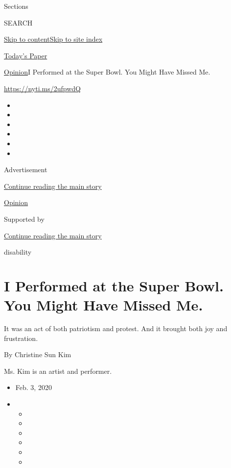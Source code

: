 Sections

SEARCH

\protect\hyperlink{site-content}{Skip to
content}\protect\hyperlink{site-index}{Skip to site index}

\href{https://myaccount.nytimes3xbfgragh.onion/auth/login?response_type=cookie\&client_id=vi}{}

\href{https://www.nytimes3xbfgragh.onion/section/todayspaper}{Today's
Paper}

\href{/section/opinion}{Opinion}\textbar{}I Performed at the Super Bowl.
You Might Have Missed Me.

\url{https://nyti.ms/2ufpwdQ}

\begin{itemize}
\item
\item
\item
\item
\item
\item
\end{itemize}

Advertisement

\protect\hyperlink{after-top}{Continue reading the main story}

\href{/section/opinion}{Opinion}

Supported by

\protect\hyperlink{after-sponsor}{Continue reading the main story}

disability

\hypertarget{i-performed-at-the-super-bowl-you-might-have-missed-me}{%
\section{I Performed at the Super Bowl. You Might Have Missed
Me.}\label{i-performed-at-the-super-bowl-you-might-have-missed-me}}

It was an act of both patriotism and protest. And it brought both joy
and frustration.

By Christine Sun Kim

Ms. Kim is an artist and performer.

\begin{itemize}
\item
  Feb. 3, 2020
\item
  \begin{itemize}
  \item
  \item
  \item
  \item
  \item
  \item
  \end{itemize}
\end{itemize}

